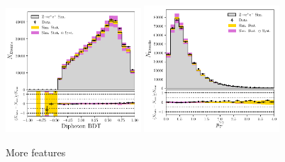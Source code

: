 \begin{figure}[h!]
\begin{center}
    \end{center}
    \begin{center}
        \includegraphics[width=0.45\textwidth]{figures/appendix_zee/dipho_bdt_zee_LPS.pdf}
        \includegraphics[width=0.45\textwidth]{figures/appendix_zee/total_ptom_zee_LPS.pdf}
    \end{center}
    \caption{More features}
\end{figure}


